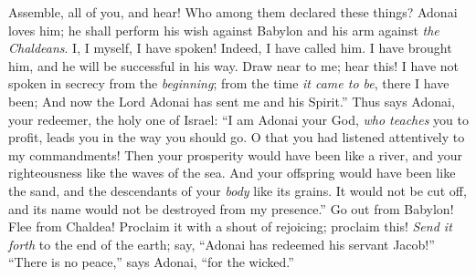 \begin{biblechapter}
\verse Assemble, all of you, and hear! 
Who among them declared these things? 
Adonai loves him; 
he shall perform his wish against Babylon 
and his arm against \textit{the Chaldeans}.
\verse I, I myself, I have spoken! 
Indeed, I have called him. 
I have brought him, 
and he will be successful in his way.
\verse Draw near to me; hear this! I have not spoken in secrecy from the \textit{beginning}; 
from the time \textit{it came to be}, there I have been; 
And now the Lord Adonai has sent me and his Spirit.”
\verse Thus says Adonai, your redeemer, the holy one of Israel: “I am Adonai your God, \textit{who teaches} you to profit, 
leads you in the way you should go.
\verse O that you had listened attentively to my commandments!
\verse Then your prosperity would have been like a river, 
and your righteousness like the waves of the sea.
\verse And your offspring would have been like the sand, 
and the descendants of your \textit{body} like its grains. 
It would not be cut off, 
and its name would not be destroyed from my presence.”
\verse Go out from Babylon! 
Flee from Chaldea! 
Proclaim it with a shout of rejoicing; proclaim this! 
\textit{Send it forth} to the end of the earth; 
say, “Adonai has redeemed his servant Jacob!”
\verse “There is no peace,” says Adonai, “for the wicked.”
\end{biblechapter}

